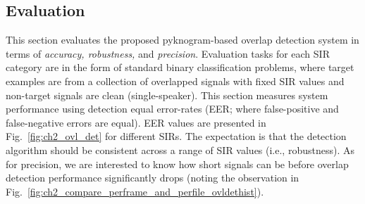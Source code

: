 {\newpage

\subsection{Evaluation}
\label{ssec:exp_pykno}

This section evaluates the proposed pyknogram-based overlap detection system in terms of {\it accuracy, robustness,} and {\it precision}. 
Evaluation tasks for each SIR category are in the form of standard binary classification problems, where target examples are from a collection of overlapped signals with fixed SIR values and non-target signals are clean (single-speaker). 
This section measures system performance using detection equal error-rates (EER; where false-positive and false-negative errors are equal). 
EER values are presented in Fig.~\ref{fig:ch2_ovl_det} for different SIRs. 
The expectation is that the detection algorithm should be consistent across a range of SIR values (i.e., robustness). 
As for precision, we are interested to know how short signals can be before overlap detection performance significantly drops (noting the observation in Fig.~\ref{fig:ch2_compare_perframe_and_perfile_ovldethist}). 


\vspace{3mm}
}
